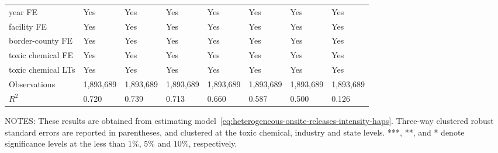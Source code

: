 \begin{table}[H]
{\begin{tabular}{@{}llllllll@{}}
            year FE                         & Yes       & Yes           & Yes       & Yes          & Yes             & Yes           & Yes                 \\
            facility FE                     & Yes       & Yes           & Yes       & Yes          & Yes             & Yes           & Yes                 \\
            border-county FE                & Yes       & Yes           & Yes       & Yes          & Yes             & Yes           & Yes                 \\
            toxic chemical FE               & Yes       & Yes           & Yes       & Yes          & Yes             & Yes           & Yes                 \\
            toxic chemical LTs              & Yes       & Yes           & Yes       & Yes          & Yes             & Yes           & Yes                 \\\midrule
            Observations                    & 1,893,689 & 1,893,689     & 1,893,689 & 1,893,689    & 1,893,689       & 1,893,689     & 1,893,689           \\
            $R^2$                           & 0.720     & 0.739         & 0.713     & 0.660        & 0.587           & 0.500         & 0.126               \\ \bottomrule\bottomrule
        \end{tabular}%
    }
    \begin{minipage}{\columnwidth}
        \vspace{0.05in}
        \tiny NOTES: These results are obtained from estimating model~\ref{eq:heterogeneous-onsite-releases-intensity-haps}. Three-way clustered robust standard errors are reported in parentheses, and clustered at the toxic chemical, industry and state levels. ***, **, and * denote significance levels at the less than $1\%$, $5\%$ and $10\%$, respectively.
    \end{minipage}
\end{table}